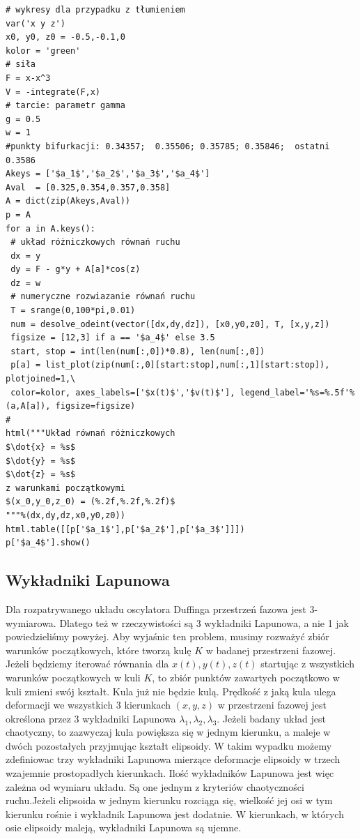 \documentclass[a4paper,12pt,polish]{sphinxmanual}
\begin{document}
\begin{verbatim}
# wykresy dla przypadku z tłumieniem
var('x y z')
x0, y0, z0 = -0.5,-0.1,0
kolor = 'green'
# siła
F = x-x^3
V = -integrate(F,x)
# tarcie: parametr gamma
g = 0.5
w = 1
#punkty bifurkacji: 0.34357;  0.35506; 0.35785; 0.35846;  ostatni 0.3586
Akeys = ['$a_1$','$a_2$','$a_3$','$a_4$']
Aval  = [0.325,0.354,0.357,0.358]
A = dict(zip(Akeys,Aval))
p = A
for a in A.keys():
 # układ różniczkowych równań ruchu
 dx = y
 dy = F - g*y + A[a]*cos(z)
 dz = w
 # numeryczne rozwiazanie równań ruchu
 T = srange(0,100*pi,0.01)
 num = desolve_odeint(vector([dx,dy,dz]), [x0,y0,z0], T, [x,y,z])
 figsize = [12,3] if a == '$a_4$' else 3.5
 start, stop = int(len(num[:,0])*0.8), len(num[:,0])
 p[a] = list_plot(zip(num[:,0][start:stop],num[:,1][start:stop]), plotjoined=1,\
 color=kolor, axes_labels=['$x(t)$','$v(t)$'], legend_label='%s=%.5f'%(a,A[a]), figsize=figsize)
#
html("""Układ równań różniczkowych
$\dot{x} = %s$
$\dot{y} = %s$
$\dot{z} = %s$
z warunkami początkowymi
$(x_0,y_0,z_0) = (%.2f,%.2f,%.2f)$
"""%(dx,dy,dz,x0,y0,z0))
html.table([[p['$a_1$'],p['$a_2$'],p['$a_3$']]])
p['$a_4$'].show()
\end{verbatim}



\subsection{Wykładniki Lapunowa}
\label{ch2/chII012:wykladniki-lapunowa}
Dla rozpatrywanego układu oscylatora Duffinga przestrzeń fazowa jest 3-wymiarowa. Dlatego też w rzeczywistości są 3 wykładniki Lapunowa, a nie 1 jak powiedzieliśmy powyżej.  Aby wyjaśnic ten problem, musimy rozważyć  zbiór warunków początkowych, które tworzą  kulę  $K$ w  badanej przestrzeni fazowej.  Jeżeli będziemy iterować równania dla $x(t), y(t), z(t)$ startując z wszystkich warunków początkowych w kuli $K$,  to zbiór punktów zawartych początkowo w kuli zmieni swój kształt. Kula już nie będzie kulą. Prędkość z jaką  kula ulega deformacji we wszystkich 3 kierunkach $(x, y, z)$ w przestrzeni fazowej  jest określona przez 3 wykładniki Lapunowa $\lambda_1, \lambda_2, \lambda_3$. Jeżeli badany układ jest chaotyczny, to zazwyczaj kula powiększa się w jednym kierunku, a maleje w dwóch pozostałych przyjmując kształt elipsoidy. W takim wypadku możemy zdefiniowac trzy wykładniki Lapunowa mierzące deformacje elipsoidy w trzech wzajemnie prostopadłych kierunkach. Ilość wykładników Lapunowa jest więc zależna od wymiaru układu. Są one jednym z kryteriów chaotyczności ruchu.Jeżeli elipsoida w jednym kierunku rozciąga się, wielkość jej osi w tym kierunku rośnie i wykładnik Lapunowa jest dodatnie. W kierunkach, w których osie elipsoidy maleją, wykładniki Lapunowa są ujemne.
\end{document}
